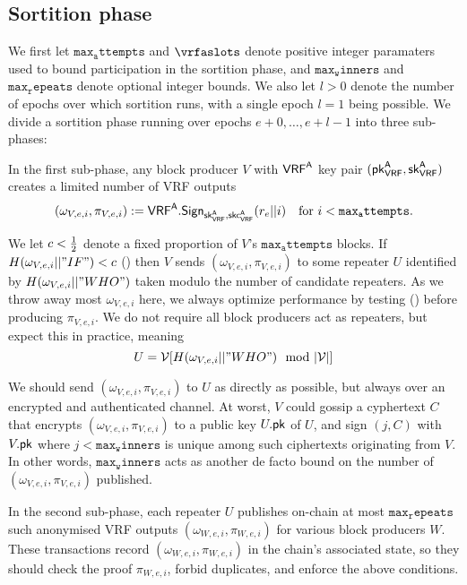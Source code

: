 \subsection{Sortition phase}\label{subsec:sortirion_phase}
\newcommand{\vrfaattemptsbound}{\mathtt{max_attempts}} %
\newcommand{\vrfawinnersbound}{\mathtt{max_winners}} %
\newcommand{\vrfarepeatbound}{\mathtt{max_repeats}} %
\newcommand{\vrfaslotsbound}{\mathtt{num_slots}} %

We first let $\vrfaattemptsbound$ and $\vrfaslots$ denote positive integer paramaters used to bound participation in the sortition phase, and $\vrfawinnersbound$ and $\vrfarepeatbound$ denote optional integer bounds.  We also let $l>0$ denote the number of epochs over which sortition runs, with a single epoch $l=1$ being possible.  We divide a sortition phase running over epochs $e+0,\ldots,e+l-1$ into three sub-phases:  

In the first sub-phase, any block producer $V$ with $\mathsf{VRF}^{\mathsf{A}}$ key pair $(\mathsf{pk}_{\mathsf{VRF}}^{\mathsf{A}},\mathsf{sk}_{\mathsf{VRF}}^{\mathsf{A}})$ creates a limited number of VRF outputs 
$$ (\omega_{V,e,i},\pi_{V,e,i}) := \VRFa.\Sign_{\skvrfa,\skcvrfa}(r_e || i) \quad \textrm{for $i < \vrfaattemptsbound$.} $$

We let $c < {1\over2}$ denote a fixed proportion of $V$'s $\vrfaattemptsbound$ blocks.  If $H(\omega_{V,e,i} || "IF") < c$ (\dag) then $V$ sends $(\omega_{V,e,i},\pi_{V,e,i})$ to some repeater $U$ identified by $H(\omega_{V,e,i} || "WHO")$ taken modulo the number of candidate repeaters.  As we throw away most $\omega_{V,e,i}$ here, we always optimize performance by testing (\dag) before producing $\pi_{V,e,i}$.  We do not require all block producers act as repeaters, but expect this in practice, meaning
$$ U = \mathcal{V}[H(\omega_{V,e,i} || "WHO") \mod |\mathcal{V}|] $$

We should send $(\omega_{V,e,i},\pi_{V,e,i})$ to $U$ as directly as possible, but always over an encrypted and authenticated channel.  At worst, $V$ could gossip a cyphertext $C$ that encrypts $(\omega_{V,e,i},\pi_{V,e,i})$ to a public key $U.\mathsf{pk}$ of $U$, and sign $(j,C)$ with $V.\mathsf{pk}$ where $j < \vrfawinnersbound$ is unique among such ciphertexts originating from $V$.  In other words, $\vrfawinnersbound$ acts as another de facto bound on the number of $(\omega_{V,e,i},\pi_{V,e,i})$ published.

In the second sub-phase, each repeater $U$ publishes on-chain at most $\vrfarepeatbound$ such anonymised VRF outputs $(\omega_{W,e,i},\pi_{W,e,i})$ for various block producers $W$.  These transactions record $(\omega_{W,e,i},\pi_{W,e,i})$ in the chain's associated state, so they should check the proof $\pi_{W,e,i}$, forbid duplicates, and enforce the above conditions.

